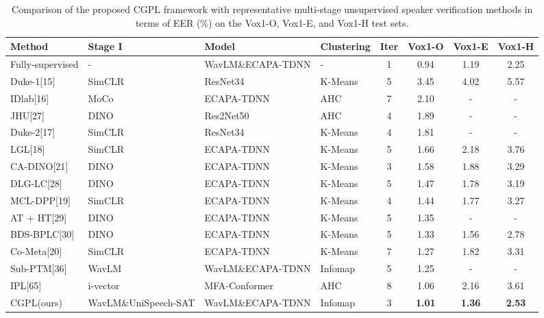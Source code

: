 \documentclass[journal]{IEEEtran}
\begin{document}
\begin{table}[t] %
    \centering
    \caption{Comparison of the proposed CGPL framework with representative multi-stage unsupervised speaker verification methods in terms of EER (\%) on the Vox1-O, Vox1-E, and Vox1-H test sets.} %
    \setlength{\tabcolsep}{10pt} %
    \begin{tabular}{l l l l c c c c} %
        \hline
        Method & Stage I & Model & Clustering & Iter & Vox1-O & Vox1-E & Vox1-H  \\
        \hline
        Fully-supervised & - & WavLM\&ECAPA-TDNN& -&1   & 0.94 & 1.19 & 2.25   \\  
        \hline
        Duke-1[15] & SimCLR &ResNet34 &K-Means& 5   & 3.45 & 4.02 & 5.57\\ 
        IDlab[16] & MoCo&ECAPA-TDNN &AHC & 7   & 2.10 & - & -   \\ 
        JHU[27] & DINO&Res2Net50 &AHC & 4   & 1.89 & - & -   \\ 
        Duke-2[17] &SimCLR& ResNet34& K-Means &4   & 1.81 & - & -   \\ 
        LGL[18]  & SimCLR&ECAPA-TDNN &K-Means& 5   & 1.66 & 2.18 & 3.76   \\ 
        CA-DINO[21] & DINO &ECAPA-TDNN&K-Means& 3   & 1.58 & 1.88 & 3.29   \\ 
        DLG-LC[28]  & DINO &ECAPA-TDNN &K-Means& 5   & 1.47 & 1.78 & 3.19   \\ 
        MCL-DPP[19]& SimCLR &ECAPA-TDNN &K-Means& 4   & 1.44 & 1.77 & 3.27   \\ 
        AT + HT[29]  & DINO &ECAPA-TDNN &K-Means& 5   & 1.35 & - & -   \\ 
        BDS-BPLC[30] & DINO &ECAPA-TDNN&K-Means& 5   & 1.33 & 1.56 & 2.78   \\ 

        Co-Meta[20] & SimCLR &ECAPA-TDNN&K-Means& 7   & 1.27 & 1.82 & 3.31   \\ 
        Sub-PTM[36] & WavLM & WavLM\&ECAPA-TDNN&Infomap & 5   & 1.25 & - & -   \\ 
        IPL[65] &i-vector &MFA-Conformer&  AHC &8   & 1.06 & 2.16 & 3.61   \\ 
        CGPL(ours) &WavLM\&UniSpeech-SAT & WavLM\&ECAPA-TDNN&Infomap& 3   & \textbf{1.01} & \textbf{1.36} & \textbf{2.53}   \\
        \hline
    \end{tabular}
    \label{tab:multi-stage comparison}
\end{table}
\FloatBarrier
\end{document}
